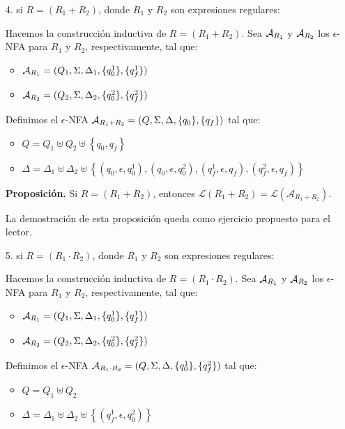 \begin{enumerate}
    \item[4.] si $R = (R_1 + R_2)$, donde $R_1$ y $R_2$ son expresiones regulares:

        Hacemos la construcción inductiva de $R = (R_1 + R_2)$. Sea $\mathcal{A}_{R_1}$ y $\mathcal{A}_{R_2}$ los $\epsilon$-NFA para $R_1$ y $R_2$, respectivamente, tal que:
        \begin{itemize}
            \item $\mathcal{A}_{R_1} = (Q_1, \Sigma, \Delta_1, \{q_0^1\}, \{q_f^1\})$
            \item $\mathcal{A}_{R_2} = (Q_2, \Sigma, \Delta_2, \{q_0^2\}, \{q_f^2\})$
        \end{itemize}

        Definimos el $\epsilon$-NFA $\mathcal{A}_{R_1 +R_2} = (Q, \Sigma, \Delta, \{q_0\}, \{q_f\})$ tal que:
        \begin{itemize}
            \item $Q=Q_1 \uplus Q_2 \uplus\left\{q_0, q_f\right\}$
            \item $\Delta=\Delta_1 \uplus \Delta_2 \uplus\left\{\left(q_0, \epsilon, q_0^1\right),\left(q_0, \epsilon, q_0^2\right),\left(q_f^1, \epsilon, q_f\right),\left(q_f^2, \epsilon, q_f\right)\right\}$
        \end{itemize}

        \textbf{Proposición.} Si $R = (R_1 +R_2)$, entonces $\mathcal{L}\left(R_1+R_2\right)=\mathcal{L}\left(\mathcal{A}_{R_1+R_2}\right)$. \medbreak

        La demostración de esta proposición queda como ejercicio propuesto para el lector.

    \item[5.] si $R = (R_1 \cdot R_2)$, donde $R_1$ y $R_2$ son expresiones regulares:

        Hacemos la construcción inductiva de $R = (R_1 \cdot R_2)$. Sea $\mathcal{A}_{R_1}$ y $\mathcal{A}_{R_2}$ los $\epsilon$-NFA para $R_1$ y $R_2$, respectivamente, tal que:
        \begin{itemize}
            \item $\mathcal{A}_{R_1} = (Q_1, \Sigma, \Delta_1, \{q_0^1\}, \{q_f^1\})$
            \item $\mathcal{A}_{R_2} = (Q_2, \Sigma, \Delta_2, \{q_0^2\}, \{q_f^2\})$
        \end{itemize}

        Definimos el $\epsilon$-NFA $\mathcal{A}_{R_1 \cdot R_2} = (Q, \Sigma, \Delta, \{q_0^1\}, \{q_f^2\})$ tal que:
        \begin{itemize}
            \item $Q=Q_1 \uplus Q_2$
            \item $\Delta=\Delta_1 \uplus \Delta_2 \uplus\left\{\left(q_f^1, \epsilon, q_0^2\right)\right\}$
        \end{itemize}


\end{enumerate}
